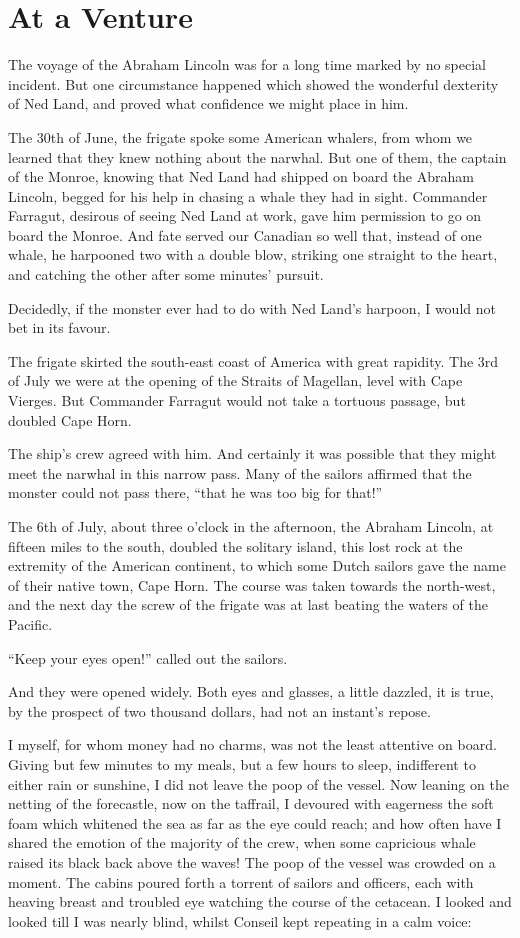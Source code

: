 \chapter{At a Venture}

The voyage of the Abraham Lincoln was for a long time marked
by no special incident.  But one circumstance happened which showed
the wonderful dexterity of Ned Land, and proved what confidence
we might place in him.

The 30th of June, the frigate spoke some American whalers,
from whom we learned that they knew nothing about the narwhal.
But one of them, the captain of the Monroe, knowing that Ned Land had
shipped on board the Abraham Lincoln, begged for his help in chasing
a whale they had in sight.  Commander Farragut, desirous of seeing
Ned Land at work, gave him permission to go on board the Monroe.
And fate served our Canadian so well that, instead of one whale,
he harpooned two with a double blow, striking one straight to the heart,
and catching the other after some minutes' pursuit.

Decidedly, if the monster ever had to do with Ned Land's harpoon,
I would not bet in its favour.

The frigate skirted the south-east coast of America with great rapidity.
The 3rd of July we were at the opening of the Straits of Magellan, level with
Cape Vierges.  But Commander Farragut would not take a tortuous passage,
but doubled Cape Horn.

The ship's crew agreed with him.  And certainly it was possible
that they might meet the narwhal in this narrow pass.
Many of the sailors affirmed that the monster could not pass there,
``that he was too big for that!''

The 6th of July, about three o'clock in the afternoon, the Abraham Lincoln,
at fifteen miles to the south, doubled the solitary island,
this lost rock at the extremity of the American continent, to which
some Dutch sailors gave the name of their native town, Cape Horn.
The course was taken towards the north-west, and the next day the screw
of the frigate was at last beating the waters of the Pacific.

``Keep your eyes open!'' called out the sailors.

And they were opened widely.  Both eyes and glasses, a little dazzled,
it is true, by the prospect of two thousand dollars, had not
an instant's repose.

I myself, for whom money had no charms, was not the least
attentive on board.  Giving but few minutes to my meals,
but a few hours to sleep, indifferent to either rain or sunshine,
I did not leave the poop of the vessel.  Now leaning on the netting
of the forecastle, now on the taffrail, I devoured with eagerness
the soft foam which whitened the sea as far as the eye could reach;
and how often have I shared the emotion of the majority of the crew,
when some capricious whale raised its black back above the waves!
The poop of the vessel was crowded on a moment.  The cabins
poured forth a torrent of sailors and officers, each with heaving
breast and troubled eye watching the course of the cetacean.
I looked and looked till I was nearly blind, whilst Conseil kept
repeating in a calm voice:

